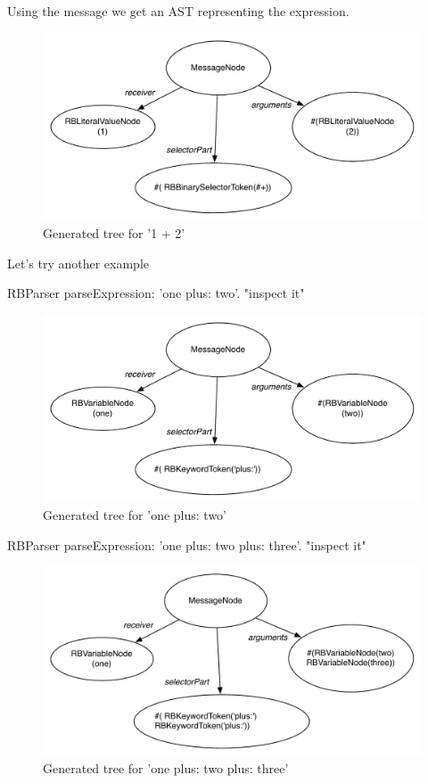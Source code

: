 \documentclass[a4paper,10pt,twoside]{book}
\begin{document}

Using the message  we get an AST representing the expression.

\begin{figure}[ht]
	\centering
	\includegraphics[width=0.7\linewidth]{SimpleAtomicExpression}
	\caption{Generated tree for  '1 + 2'   }
\end{figure}

Let's try another example
\begin{code}{}
RBParser parseExpression: 'one plus: two'.
"inspect it"
\end{code}


\begin{figure}[ht]\centering
	\includegraphics[width=0.7\linewidth]{SimpleAtomicExpressionP}
	\caption{Generated tree for  'one plus: two'  }
\end{figure}



\begin{code}{}
RBParser parseExpression: 'one plus: two plus: three'.
"inspect it"
\end{code}
\begin{figure}[ht]\centering
	\includegraphics[width=0.7\linewidth]{SimpleMultiExpression}
	\caption{Generated tree for  'one plus: two plus: three' }
\end{figure}
\end{document}
